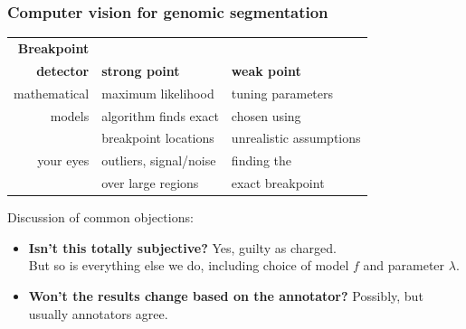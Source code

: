 \documentclass{beamer}
\begin{document}
\begin{frame}
  \frametitle{Computer vision for genomic segmentation}
  \begin{center}
  \begin{tabular}{rll}
    \textbf{Breakpoint}\\
 \textbf{detector} & \textbf{strong point} & \textbf{weak point} \\
    \hline
    mathematical  & maximum likelihood & tuning parameters \\
    models & algorithm finds exact  & chosen using\\
& breakpoint locations  & unrealistic assumptions\\
    \hline
    your eyes & outliers, signal/noise & finding the \\
    & over large regions &  exact breakpoint
  \end{tabular}
  \end{center}

  Discussion of common objections:
  \begin{itemize}
  \item \textbf{Isn't this totally subjective?} Yes, guilty as
    charged. \\
    But so is everything else we do, including choice of
    model $f$ and parameter $\lambda$.
  \item \textbf{Won't the results change based on the annotator?}
    Possibly, but usually annotators agree.
  \end{itemize}
\end{frame}
\end{document}
